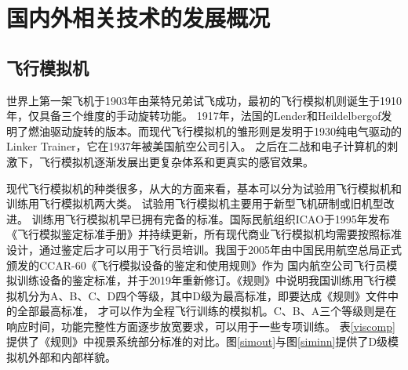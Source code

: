 \section{国内外相关技术的发展概况}
\subsection{飞行模拟机}
世界上第一架飞机于1903年由莱特兄弟试飞成功，最初的飞行模拟机则诞生于1910年，仅具备三个维度的手动旋转功能\cite{simhis1}。 1917年，法国的Lender和Heildelbergof发明了燃油驱动旋转的版本\cite{simhis2}。而现代飞行模拟机的雏形则是发明于1930纯电气驱动的Linker Trainer，它在1937年被美国航空公司引入。
之后在二战和电子计算机的刺激下，飞行模拟机逐渐发展出更复杂体系和更真实的感官效果\cite{simulator2}。
\par
现代飞行模拟机的种类很多，从大的方面来看，基本可以分为试验用飞行模拟机和训练用飞行模拟机两大类。
试验用飞行模拟机主要用于新型飞机研制或旧机型改进。
训练用飞行模拟机早已拥有完备的标准。国际民航组织ICAO于1995年发布《飞行模拟鉴定标准手册》并持续更新\cite{normalize2}，所有现代商业飞行模拟机均需要按照标准设计，通过鉴定后才可以用于飞行员培训。我国于2005年由中国民用航空总局正式颁发的CCAR-60《飞行模拟设备的鉴定和使用规则》作为
国内航空公司飞行员模拟训练设备的鉴定标准，并于2019年重新修订\cite{normalize1}。《规则》中说明我国训练用飞行模拟机分为A、B、C、D四个等级，其中D级为最高标准，即要达成《规则》文件中的全部最高标准，
才可以作为全程飞行训练的模拟机。C、B、A三个等级则是在响应时间，功能完整性方面逐步放宽要求，可以用于一些专项训练。
表\ref{viscomp}提供了《规则》中视景系统部分标准的对比。图\ref{simout}与图\ref{siminn}提供了D级模拟机外部和内部样貌。
